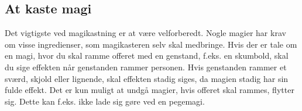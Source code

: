 \subsection*{At kaste magi}
Det vigtigste ved magikastning er at være velforberedt. Nogle magier har krav om visse ingredienser, som magikasteren selv skal medbringe. Hvis der er tale om en magi, hvor du skal ramme offeret med en genstand, f.eks. en skumbold, skal du sige effekten når genstanden rammer personen. Hvis genstanden rammer et sværd, skjold eller lignende, skal effekten stadig siges, da magien stadig har sin fulde effekt. Det er kun muligt at undgå magier, hvis offeret skal rammes, flytter sig. Dette kan f.eks. ikke lade sig gøre ved en pegemagi.
